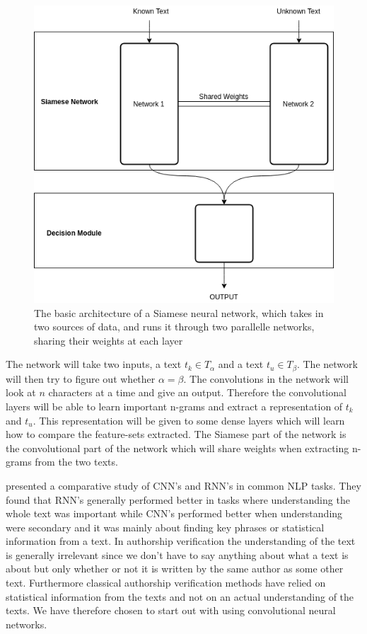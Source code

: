 \begin{figure}
    \centering
    \includegraphics[scale=0.5]{./pictures/method/Siamese.png}
    \caption{The basic architecture of a Siamese neural network, which takes in
        two sources of data, and runs it through two parallelle networks,
        sharing their weights at each layer}
    \label{fig:siamese_example}
\end{figure}

The network will take two inputs, a text $t_k \in T_\alpha$ and a text $t_u
\in T_\beta$. The network will then try to figure out whether $\alpha =
\beta$. The convolutions in the network will look at $n$ characters at a
time and give an output. Therefore the convolutional layers will be able to
learn important n-grams and extract a representation of $t_k$ and $t_u$. This
representation will be given to some dense layers which will learn how to
compare the feature-sets extracted. The Siamese part of the network is the
convolutional part of the network which will share weights when extracting
n-grams from the two texts.

\cite{DBLP:journals/corr/0001KYS17} presented a comparative study of \gls{CNN}'s
and \gls{RNN}'s in common \gls{NLP} tasks. They found that \gls{RNN}'s generally
performed better in tasks where understanding the whole text was important while
\gls{CNN}'s performed better when understanding were secondary and it was mainly
about finding key phrases or statistical information from a text. In authorship
verification the understanding of the text is generally irrelevant since we
don't have to say anything about what a text is about but only whether or not it
is written by the same author as some other text. Furthermore classical
authorship verification methods have relied on statistical information from the
texts and not on an actual understanding of the texts. We have therefore chosen
to start out with using convolutional neural networks.

